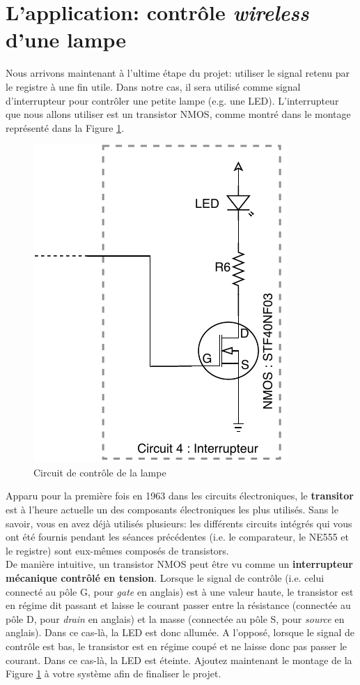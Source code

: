 \section{L'application: contrôle \textit{wireless} d'une lampe}
Nous arrivons maintenant à l'ultime étape du projet: utiliser le signal retenu par le registre à une fin utile. Dans notre cas, il sera utilisé comme signal d'interrupteur pour contrôler une petite lampe (e.g. une LED). L'interrupteur que nous allons utiliser est un transistor NMOS, comme montré dans le montage représenté dans la Figure \ref{fig:lampe}. \\ 

\begin{figure}[h!]
    \centering
    \includegraphics{HO3_MOS.pdf}
    \caption{Circuit de contrôle de la lampe}
    \label{fig:lampe}
\end{figure}

Apparu pour la première fois en 1963 dans les circuits électroniques, le \textbf{transitor} est à l'heure actuelle un des composants électroniques les plus utilisés. Sans le savoir, vous en avez déjà utilisés plusieurs: les différents circuits intégrés qui vous ont été fournis pendant les séances précédentes (i.e. le comparateur, le NE555 et le registre) sont eux-mêmes composés de transistors. \\

De manière intuitive, un transistor NMOS peut être vu comme un \textbf{interrupteur mécanique contrôlé en tension}. Lorsque le signal de contrôle (i.e. celui connecté au pôle G, pour \textit{gate} en anglais) est à une valeur haute, le transistor est en régime dit passant et laisse le courant passer entre la résistance (connectée au pôle D, pour \textit{drain} en anglais) et la masse (connectée au pôle S, pour \textit{source} en anglais). Dans ce cas-là, la LED est donc allumée. A l'opposé, lorsque le signal de contrôle est bas, le transistor est en régime coupé et ne laisse donc pas passer le courant. Dans ce cas-là, la LED est éteinte. Ajoutez maintenant le montage de la Figure \ref{fig:lampe} à votre système afin de finaliser le projet. \\

